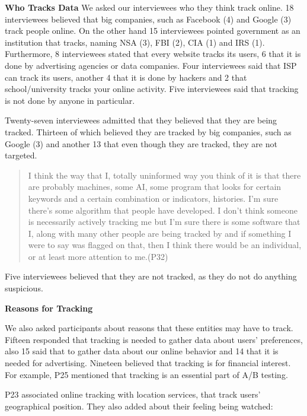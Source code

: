 \textbf{Who Tracks Data}
We asked our interviewees who they think track online. 18 interviewees believed that big companies, such as Facebook (4) and Google (3) track people online. On the other hand 15 interviewees pointed government as an institution that tracks, naming NSA (3), FBI (2), CIA (1) and IRS (1). Furthermore, 8 interviewees stated that every website tracks its users, 6 that it is done by advertising agencies or data companies. Four interviewees said that ISP can track its users, another 4 that it is done by hackers and 2 that school/university tracks your online activity. Five interviewees said that tracking is not done by anyone in particular.

Twenty-seven interviewees admitted that they believed that they are being tracked. Thirteen of which believed they are tracked by big companies, such as Google (3) and another 13 that even though they are tracked, they are not targeted. 


\begin{quote}I think the way that I, totally uninformed way you think of it is that there are probably machines, some AI, some program that looks for certain keywords and a certain combination or indicators, histories. I'm sure there's some algorithm that people have developed. I don't think someone is necessarily actively tracking me but I'm sure there is some software that I, along with many other people are being tracked by and if something I were to say was flagged on that, then I think there would be an individual, or at least more attention to me.(P32)\end{quote}


Five interviewees believed that they are not tracked, as they do not do anything suspicious.


\textbf{Reasons for Tracking}    

We also asked participants about reasons that these entities may have to track. Fifteen responded that tracking is needed to gather data about users' preferences, also 15 said that to gather data about our online behavior and 14 that it is needed for advertising. Nineteen believed that tracking is for financial interest. For example, P25 mentioned that tracking is an essential part of A/B testing. 

P23 associated online tracking with location services, that track users' geographical position. They also added about their feeling being watched:

